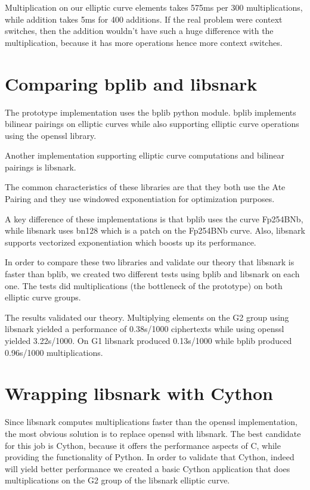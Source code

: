 \documentclass{article}
\begin{document}
Multiplication on our elliptic curve elements takes 575ms per 300
multiplications, while addition takes 5ms for 400 additions. If the real
problem were context switches, then the addition wouldn't have such a huge
difference with the multiplication, because it has more operations hence
more context switches.


\section{Comparing bplib and libsnark}

The prototype implementation uses the bplib\cite{bplib} python module.
bplib implements bilinear pairings on elliptic curves while also supporting
elliptic curve operations using the openssl library.

Another implementation supporting elliptic curve computations and bilinear
pairings is libsnark\cite{libsnark}.

The common characteristics of these libraries are that they both use the
Ate Pairing and they use windowed exponentiation for
optimization purposes.

A key difference of these implementations is that bplib uses the
curve Fp254BNb, while libsnark uses bn128 which is a patch on the
Fp254BNb curve. Also, libsnark supports vectorized exponentiation
which boosts up its performance.

In order to compare these two libraries and validate our theory that
libsnark is faster than bplib, we created two different tests
using bplib and libsnark on each one. The tests did multiplications
(the bottleneck of the prototype) on both elliptic curve groups.

The results validated our theory. Multiplying elements on the G2
group using libsnark yielded a performance of 0.38s/1000 ciphertexts
while using openssl yielded 3.22s/1000. On G1 libsnark produced
0.13s/1000 while bplib produced 0.96s/1000 multiplications.


\section{Wrapping libsnark with Cython}

Since libsnark computes multiplications faster than the openssl
implementation, the most obvious solution is to replace openssl
with libsnark. The best candidate for this job is Cython, because
it offers the performance aspects of C, while providing the functionality
of Python. In order to validate that Cython, indeed will yield better
performance we created a basic Cython application that does multiplications
on the G2 group of the libsnark elliptic curve.
\end{document}
